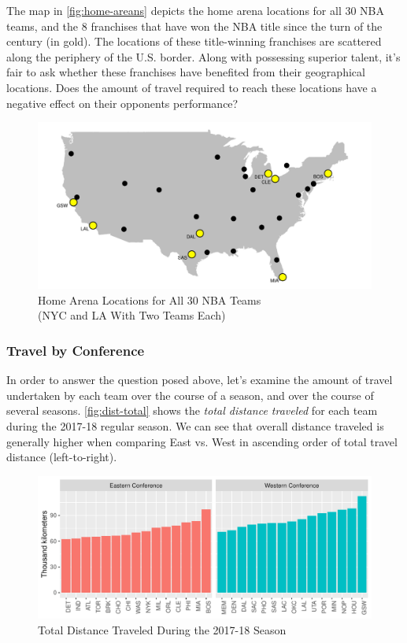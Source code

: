 \documentclass[
    12pt,
    a4paper,
    titlepage,  %
    abstract,  %
    headings=standardclasses,  %
    bibliography=totocnumbered  %
]{scrartcl}
\begin{document}
The map in \autoref{fig:home-areans} depicts the home arena locations for all 30 NBA teams, and the 8 franchises that have won the NBA title since the turn of the century (in gold). The locations of these title-winning franchises are scattered along the periphery of the U.S. border. Along with possessing superior talent, it's fair to ask whether these franchises have benefited from their geographical locations. Does the amount of travel required to reach these locations have a negative effect on their opponents performance?

\begin{figure}[ht]
    \centering
    \includegraphics[trim=10 10 20 10,clip,width=\linewidth]{home-arenas}
    \caption{Home Arena Locations for All 30 NBA Teams \\ (NYC and LA With Two Teams Each)}
    \label{fig:home-areans}
\end{figure}

\subsubsection*{Travel by Conference}

In order to answer the question posed above, let's examine the amount of travel undertaken by each team over the course of a season, and over the course of several seasons. \autoref{fig:dist-total} shows the \emph{total distance traveled} for each team during the 2017-18 regular season. We can see that overall distance traveled is generally higher when comparing East vs. West in ascending order of total travel distance (left-to-right).

\begin{figure}[ht]
    \centering
    \includegraphics[width=\linewidth]{dist-total}
    \caption{Total Distance Traveled During the 2017-18 Season}
    \label{fig:dist-total}
\end{figure}
\end{document}
